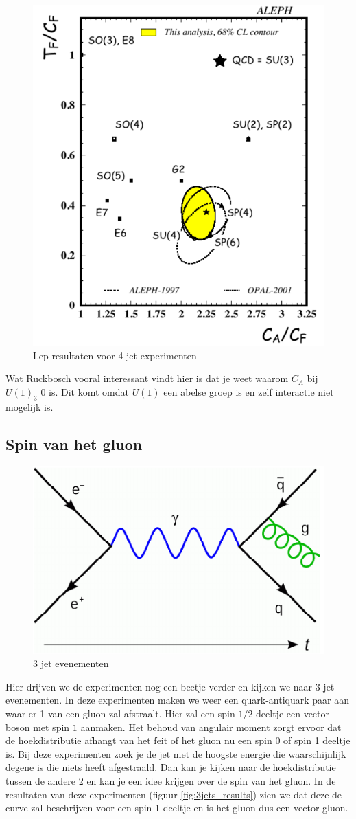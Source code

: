 \documentclass[../main.tex]{subfiles}
\begin{document}
\begin{figure}[h]
    \centering
    \includegraphics[width=0.4\linewidth]{QCD/4jets_results.png}
    \caption{Lep resultaten voor 4 jet experimenten}%
    \label{fig:4jets_results}
\end{figure}

{\color{red} Wat Ruckbosch vooral interessant vindt hier is dat je weet waarom $C_A$ bij $U(1)_3$ 0 is. Dit komt omdat $U(1)$ een abelse groep is en zelf interactie niet mogelijk is.}

\subsection{Spin van het gluon}%
\label{sub:spin_van_het_gluon}

\begin{figure}[h]
    \centering
    \includegraphics[width=0.4\linewidth]{QCD/3jets.png}
    \caption{3 jet evenementen}%
    \label{fig:3jets}
\end{figure}

Hier drijven we de experimenten nog een beetje verder en kijken we naar 3-jet evenementen. In deze experimenten maken we weer een quark-antiquark paar aan waar er 1 van een gluon zal afstraalt. Hier zal een spin $1/2$ deeltje een vector boson met spin $1$ aanmaken. Het behoud van angulair moment zorgt ervoor dat de hoekdistributie afhangt van het feit of het gluon nu een spin 0 of spin 1 deeltje is.
Bij deze experimenten zoek je de jet met de hoogste energie die waarschijnlijk degene is die niets heeft afgestraald. Dan kan je kijken naar de hoekdistributie tussen de andere 2 en kan je een idee krijgen over de spin van het gluon. In de resultaten van deze experimenten (figuur \ref{fig:3jets_results}) zien we dat deze de curve zal beschrijven voor een spin 1 deeltje en is het gluon dus een vector gluon.
\end{document}
